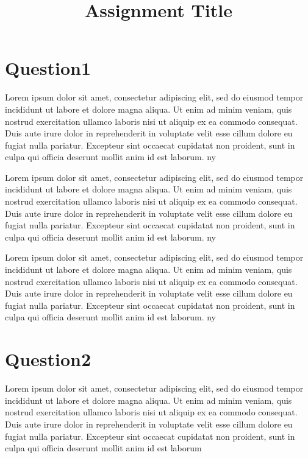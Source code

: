 \documentclass[
    12pt	%
    ]{article}
\title{Assignment Title}
\begin{document}
  

\maketitle

\settowidth{\parindent}{~~~~~}

\tableofcontents
\listoffigures
\listoftables

\section{Question1}
Lorem ipsum dolor sit amet, consectetur adipiscing elit, sed do eiusmod tempor incididunt ut labore et dolore magna aliqua. Ut enim ad minim veniam, quis nostrud exercitation ullamco laboris nisi ut aliquip ex ea commodo consequat. Duis aute irure dolor in reprehenderit in voluptate velit esse cillum dolore eu fugiat nulla pariatur. Excepteur sint occaecat cupidatat non proident, sunt in culpa qui officia deserunt mollit anim id est laborum. \ac{ny}

Lorem ipsum dolor sit amet, consectetur adipiscing elit, sed do eiusmod tempor incididunt ut labore et dolore magna aliqua. Ut enim ad minim veniam, quis nostrud exercitation ullamco laboris nisi ut aliquip ex ea commodo consequat. Duis aute irure dolor in reprehenderit in voluptate velit esse cillum dolore eu fugiat nulla pariatur. Excepteur sint occaecat cupidatat non proident, sunt in culpa qui officia deserunt mollit anim id est laborum. \ac{ny}

Lorem ipsum dolor sit amet, consectetur adipiscing elit, sed do eiusmod tempor incididunt ut labore et dolore magna aliqua. Ut enim ad minim veniam, quis nostrud exercitation ullamco laboris nisi ut aliquip ex ea commodo consequat. Duis aute irure dolor in reprehenderit in voluptate velit esse cillum dolore eu fugiat nulla pariatur. Excepteur sint occaecat cupidatat non proident, sunt in culpa qui officia deserunt mollit anim id est laborum. \ac{ny}

\section{Question2}
Lorem ipsum dolor sit amet, consectetur adipiscing elit, sed do eiusmod tempor incididunt ut labore et dolore magna aliqua. Ut enim ad minim veniam, quis nostrud exercitation ullamco laboris nisi ut aliquip ex ea commodo consequat. Duis aute irure dolor in reprehenderit in voluptate velit esse cillum dolore eu fugiat nulla pariatur. Excepteur sint occaecat cupidatat non proident, sunt in culpa qui officia deserunt mollit anim id est laborum \cite{zorlu2005effect}
\end{document}
